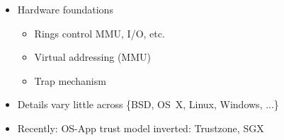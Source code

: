 \begin{frame}
\begin{columns}[T]
\begin{itemize}
	\pause

	\item Hardware foundations
	\begin{itemize}
	  \item Rings control MMU, I/O, etc.
	  \item Virtual addressing (MMU)
	  \item Trap mechanism
        \end{itemize}

        \pause

	\item Details vary little across \{BSD, OS~X, Linux, Windows, ...\}

	\pause

	\item Recently: OS-App trust model inverted: Trustzone, SGX
      \end{itemize}
  \end{columns}
\end{frame}


